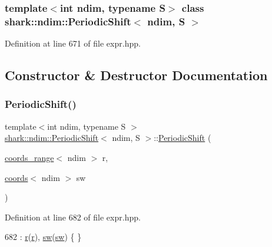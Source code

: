 \subsubsection*{template$<$int ndim, typename S$>$\newline
class shark\+::ndim\+::\+Periodic\+Shift$<$ ndim, S $>$}



Definition at line 671 of file expr.\+hpp.



\subsection{Constructor \& Destructor Documentation}
\hypertarget{classshark_1_1ndim_1_1_periodic_shift_aceef16e1e0671276f46277d219386d68}{}\label{classshark_1_1ndim_1_1_periodic_shift_aceef16e1e0671276f46277d219386d68} 
\subsubsection{\texorpdfstring{Periodic\+Shift()}{PeriodicShift()}}
{\footnotesize\ttfamily template$<$int ndim, typename S $>$ \\
\hyperlink{classshark_1_1ndim_1_1_periodic_shift}{shark\+::ndim\+::\+Periodic\+Shift}$<$ ndim, S $>$\+::\hyperlink{classshark_1_1ndim_1_1_periodic_shift}{Periodic\+Shift} (\begin{DoxyParamCaption}\item[{\hyperlink{structshark_1_1ndim_1_1coords__range}{coords\+\_\+range}$<$ ndim $>$}]{r,  }\item[{\hyperlink{structshark_1_1ndim_1_1coords}{coords}$<$ ndim $>$}]{sw }\end{DoxyParamCaption})}



Definition at line 682 of file expr.\+hpp.


\begin{DoxyCode}
682 : \hyperlink{classshark_1_1ndim_1_1_periodic_shift_ad2b058280d2b466c8acb82e6f473e240}{r}(\hyperlink{classshark_1_1ndim_1_1_periodic_shift_ad2b058280d2b466c8acb82e6f473e240}{r}), \hyperlink{classshark_1_1ndim_1_1_periodic_shift_aded04c5bc0760cfb247590c85921b653}{sw}(\hyperlink{classshark_1_1ndim_1_1_periodic_shift_aded04c5bc0760cfb247590c85921b653}{sw}) \{ \}
\end{DoxyCode}


